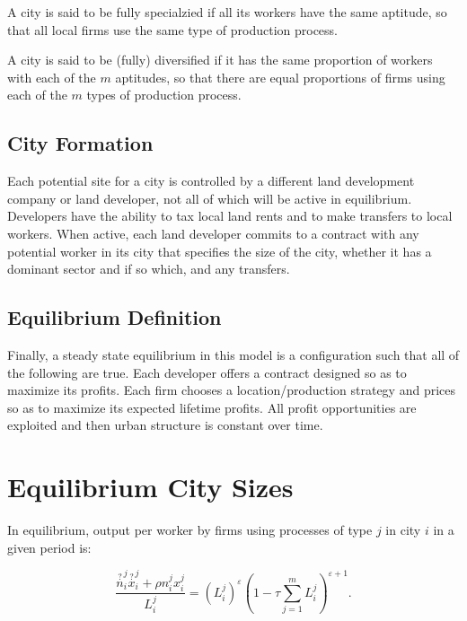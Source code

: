 \begin{definition}
  A city is said to be fully specialzied if all its workers have the same aptitude, so that all local firms use the same type of production process.
\end{definition}

\begin{definition}
 A city is said to be (fully) diversified if it has the same proportion of workers with each of the $m$ aptitudes, so that there are equal proportions of firms using each of the $m$ types of production process. 
\end{definition}

\subsection{City Formation}

Each potential site for a city is controlled by a different land development company or land developer, not all of which will be active in equilibrium. Developers have the ability to tax local land rents and to make transfers to local workers. When active, each land developer commits to a contract with any potential worker in its city that specifies the size of the city, whether it has a dominant sector and if so which, and any transfers.

\subsection{Equilibrium Definition}

Finally, a steady state equilibrium in this model is a configuration such that all of the following are true. Each developer offers a contract designed so as to maximize its profits. Each firm chooses a location/production strategy and prices so as to maximize its expected lifetime profits. All profit opportunities are exploited and then urban structure is constant over time.

\section{Equilibrium City Sizes}

\begin{lemma}
  In equilibrium, output per worker by firms using processes of type $j$ in city $i$ in a given period is:

  \begin{equation*}
    \frac{\overset{?}{n}_i^j \overset{?}{x}_i^j + \rho n_i^j x_i^j}{L_i^j} = (L_i^j)^{\varepsilon} (1 - \tau \sum_{j=1}^m L_i^j)^{\varepsilon + 1}.
  \end{equation*}
\end{lemma}

